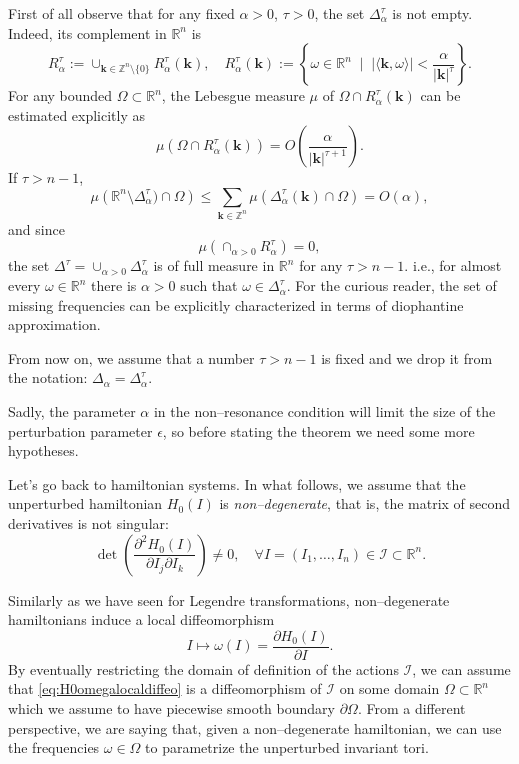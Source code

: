 \documentclass[english,fontsize=11pt,paper=a5,oneside]{scrbook}
\newcommand{\cI}{\mathcal{I}}
\newcommand{\Z}{\mathbb{Z}}
\newcommand{\R}{\mathbb{R}}
\newcommand{\lag}{\langle}
\newcommand{\rag}{\rangle}
\theoremstyle{definition}
\begin{document}
First of all observe that for any fixed $\alpha>0$, $\tau>0$, the set $\Delta_\alpha^\tau$ is not empty. Indeed, its complement in $\R^n$ is
\begin{equation}
  R_{\alpha}^\tau := \cup_{\bm k \in \Z^n\setminus\{0\}} R_{\alpha}^\tau(\bm k),\quad
  R_{\alpha}^\tau(\bm k) := \left\{ \omega \in\R^n \;\mid\; |\lag\bm k, \omega\rag| < \frac{\alpha}{|\bm k|^\tau} \right\}.
\end{equation}
For any bounded $\Omega\subset\R^n$, the Lebesgue measure $\mu$ of $\Omega\cap R_{\alpha}^\tau(\bm k)$ can be estimated explicitly as
\begin{equation}
  \mu(\Omega\cap R_{\alpha}^\tau(\bm k)) = O\left(\frac{\alpha}{|\bm k|^{\tau+1}}\right).
\end{equation}
If $\tau > n-1$,
\begin{equation}
  \mu\left(\R^n\setminus\Delta_\alpha^\tau)\cap\Omega\right)\leq
  \sum_{\bm k\in\Z^n} \mu\left(\Delta_{\alpha}^\tau(\bm k)\cap\Omega\right) = O(\alpha),
\end{equation}
and since
\begin{equation}
  \mu\left(\cap_{\alpha>0}R_{\alpha}^\tau\right)=0,
\end{equation}
the set $\Delta^\tau = \cup_{\alpha>0}\Delta_\alpha^\tau$ is of full measure in $\R^n$ for any $\tau > n-1$. i.e., for almost every $\omega\in\R^n$ there is $\alpha>0$ such that $\omega \in \Delta^\tau_\alpha$.
For the curious reader, the set of missing frequencies can be explicitly characterized in terms of diophantine approximation.

From now on, we assume that a number $\tau > n-1$ is fixed and we drop it from the notation: $\Delta_\alpha = \Delta_\alpha^\tau$.

Sadly, the parameter $\alpha$ in the non--resonance condition will limit the size of the perturbation parameter $\epsilon$, so before stating the theorem we need some more hypotheses.

Let's go back to hamiltonian systems.
In what follows, we assume that the unperturbed hamiltonian $H_0(I)$ is \emph{non--degenerate}, that is, the matrix of second derivatives is not singular:
\begin{equation}\label{eq:Hnondeg}
  \det\left(\frac{\partial^2 H_0(I)}{\partial I_j \partial I_k}\right) \neq 0, \quad \forall I = (I_1, \ldots, I_n)\in\cI\subset\R^n.
\end{equation}

Similarly as we have seen for Legendre transformations, non--degenerate hamiltonians induce a local diffeomorphism
\begin{equation}\label{eq:H0omegalocaldiffeo}
  I \mapsto \omega(I) = \frac{\partial H_0(I)}{\partial I}.
\end{equation}
By eventually restricting the domain of definition of the actions $\cI$, we can assume that \eqref{eq:H0omegalocaldiffeo} is a diffeomorphism of $\cI$ on some domain $\Omega\subset\R^n$ which we assume to have piecewise smooth boundary $\partial\Omega$.
From a different perspective, we are saying that, given a non--degenerate hamiltonian, we can use the frequencies $\omega\in\Omega$ to parametrize the unperturbed invariant tori.
\end{document}
